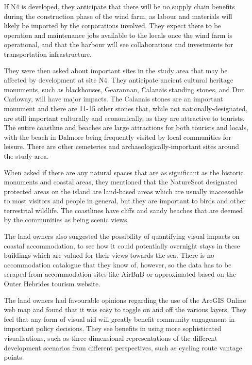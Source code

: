 If N4 is developed, they anticipate that there will be no supply chain benefits during the construction phase of the wind farm, as labour and materials will likely be imported by the corporations involved. They expect there to be operation and maintenance jobs available to the locals once the wind farm is operational, and that the harbour will see collaborations and investments for transportation infrastructure.

They were then asked about important sites in the study area that may be affected by development at site N4. They anticipate ancient cultural heritage monuments, such as blackhouses, Gearannan, Calanais standing stones, and Dun Carloway, will have major impacts. The Calanais stones are an important monument and there are 11-15 other stones that, while not nationally-designated, are still important culturally and economically, as they are attractive to tourists. The entire coastline and beaches are large attractions for both tourists and locals, with the beach in Dalmore being frequently visited by local communities for leisure. There are other cemeteries and archaeologically-important sites around the study area.

When asked if there are any natural spaces that are as significant as the historic monuments and coastal areas, they mentioned that the NatureScot designated protected areas on the island are land-based areas which are usually inaccessible to most visitors and people in general, but they are important to birds and other terrestrial wildlife. The coastlines have cliffs and sandy beaches that are deemed by the communities as being scenic views.

The land owners also suggested the possibility of quantifying visual impacts on coastal accommodation, to see how it could potentially overnight stays in these buildings which are valued for their views towards the sea. There is no accommodation catalogue that they know of, however, so the data has to be scraped from accommodation sites like AirBnB or approximated based on the Outer Hebrides tourism website.

The land owners had favourable opinions regarding the use of the ArcGIS Online web map and found that it was easy to toggle on and off the various layers. They feel that any form of visual aid will greatly benefit community engagement in important policy decisions. They see benefits in using more sophisticated visualisations, such as three-dimensional representations of the different development scenarios from different perspectives, such as cycling route vantage points.

